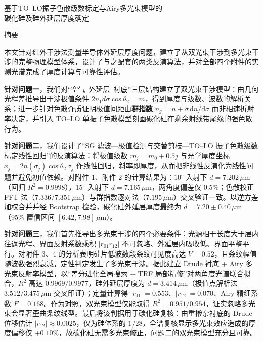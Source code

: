 \documentclass[11pt,a4paper,fontset=fandol]{ctexart}
\newcommand{\um}{\,\mu\mathrm{m}}
\begin{document}
\begin{center}
    {\heiti 基于TO--LO振子色散级数标定与Airy多光束模型的\\[0.2em]碳化硅及硅外延层厚度确定}
\end{center}

\begin{center}
    {\heiti 摘\quad 要}
\end{center}

本文针对红外干涉法测量半导体外延层厚度问题，建立了从双光束干涉到多光束干涉的完整物理模型体系，设计了与之配套的两类反演算法，并对全部四个附件的实测光谱完成了厚度计算与可靠性评估。

\textbf{针对问题一}，我们对``空气--外延层--衬底''三层结构建立了双光束干涉模型：由几何光程差推导出干涉极值条件 $2n_1d\sigma\cos\theta_2=m$，得到厚度与级数、波数的解析关系；进一步针对色散介质证明极值间距由\textbf{群指数} $n_g=n+\sigma\,\mathrm{d}n/\mathrm{d}\sigma$ 而非相速折射率决定，并引入 TO--LO 单振子色散模型刻画碳化硅在剩余射线带尾缘的强色散行为。

\textbf{针对问题二}，我们设计了``SG 滤波---极值检测与交替剪枝---TO--LO 振子色散级数标定线性回归''的反演算法：将极值级数 $m_j=m_0+0.5j$ 与光学厚度坐标 $x_j=2n(\sigma_j)\cos\theta_2\,\sigma_j$ 作线性回归，斜率即厚度，从而把非线性反演化为线性问题并避免初值依赖。对附件 1、附件 2 的计算结果为：$10^\circ$ 入射下 $d=7.202\um$（回归 $R^2=0.9998$），$15^\circ$ 入射下 $d=7.165\um$，两角度偏差仅 $0.5\%$；色散校正 FFT 法（$7.336/7.351\um$）与群指数逐对法（$7.195\um$）交叉验证一致。以逆方差加权合并并经 Bootstrap 检验，碳化硅外延层厚度最终为 $d=7.20\pm0.40\um$（95\% 置信区间 $[6.42,7.98]\um$）。

\textbf{针对问题三}，我们首先推导出多光束干涉的四个必要条件：光源相干长度大于层内往返光程、界面反射系数乘积 $|r_{01}r_{12}|$ 不可忽略、外延层内吸收低、界面平整平行。对附件 3、4 的分析表明硅片低波数段条纹可见度高达 $V=0.52$，且条纹幅值随波数强烈衰减，定性判定发生了多光束干涉。据此建立 Drude 衬底 $+$ Airy 多光束反射率模型，以``差分进化全局搜索 $+$ TRF 局部精修''对两角度光谱联合拟合，$R^2$ 高达 $0.9969/0.9977$，硅外延层厚度为 $d=3.414\um$（极值点解析法 $3.512/3.475\um$ 交叉印证）；定量计算得 $|r_{01}|=0.553$、$|r_{12}|=0.070$、Airy 精细系数 $F=0.168$。作为对照，双光束模型仅能取得 $R^2=0.951/0.954$，证实忽略多光束会显著歪曲条纹线型。最后将该判据用于碳化硅复核：由重掺杂衬底的 Drude 位移估计 $|r_{12}|\approx0.0025$，仅为硅体系的 $1/28$，全谱复核显示多光束效应造成的厚度偏移仅 $+0.10\%$，故碳化硅无需多光束修正，问题二的双光束模型充分且可靠。
\end{document}
